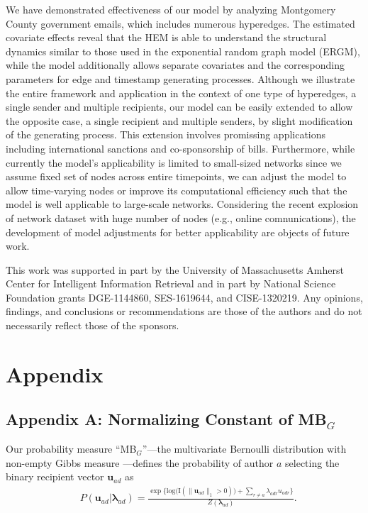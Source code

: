 \documentclass[ba]{imsart}
\numberwithin{equation}{section}
\theoremstyle{plain}
\begin{document}
We have demonstrated effectiveness of our model by analyzing Montgomery County government emails, which includes numerous hyperedges. The estimated covariate effects reveal that the HEM is able to understand the structural dynamics similar to those used in the exponential random graph model (ERGM), while the model additionally allows separate covariates and the corresponding parameters for edge and timestamp generating processes. Although we illustrate the entire framework and application in the context
of one type of hyperedges, a single sender and multiple recipients, our model can be easily extended to allow the opposite case, a single recipient and multiple senders, by slight modification of the generating process. This extension involves promissing applications including international sanctions and co-sponsorship of bills. Furthermore, while currently the model's applicability is limited to small-sized networks since we assume fixed set of nodes across entire timepoints, we can adjust the model to allow time-varying nodes or improve its computational efficiency such that the model is well applicable to large-scale networks. Considering the recent explosion of network dataset with huge number of nodes (e.g., online comnunications), the development of model adjustments for better applicability are objects of future work.

\begin{acknowledgement}
	This work was supported in part by the University of Massachusetts Amherst Center for Intelligent Information Retrieval and in part by National Science Foundation grants DGE-1144860, SES-1619644, and CISE-1320219. Any opinions, findings, and conclusions or recommendations are those of the authors and do not necessarily reflect those of the
	sponsors.
\end{acknowledgement}

\section*{Appendix}
	\subsection*{Appendix A: Normalizing Constant of MB$_{G}$}\label{subsec: non-empty Gibbs measure}
	Our probability measure ``MB$_{G}$''---the multivariate Bernoulli distribution with non-empty Gibbs measure \citep{fellows2017removing}---defines the probability of author $a$ selecting the binary recipient vector $\boldsymbol{u}_{ad}$ as
	\begin{equation*} 
	\begin{aligned}
	& P(\boldsymbol{u}_{ad}|\boldsymbol{\lambda}_{ad} ) = \frac{\exp\Big\{ \mbox{log}\big(\text{I}(\lVert \boldsymbol{u}_{ad} \rVert_1 > 0)\big) + \sum_{r \neq a} \lambda_{adr}u_{adr} \Big\}}{Z(\boldsymbol{\lambda}_{ad})}.
	\end{aligned}
	\end{equation*}
	
\end{document}
